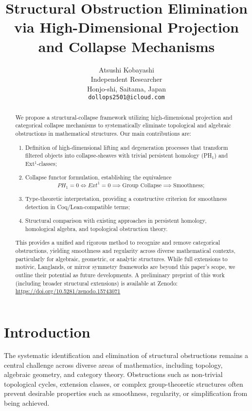 \documentclass[11pt]{article}
\title{Structural Obstruction Elimination via High-Dimensional Projection and Collapse Mechanisms}
\author{Atsushi Kobayashi\\
Independent Researcher\\
Honjo-shi, Saitama, Japan\\
\texttt{dollops2501@icloud.com}
}
\date{}
\begin{document}
\maketitle



\begin{abstract}
We propose a structural-collapse framework utilizing high-dimensional projection and categorical collapse mechanisms to systematically eliminate topological and algebraic obstructions in mathematical structures. Our main contributions are: 
\begin{enumerate}
    \item Definition of high-dimensional lifting and degeneration processes that transform filtered objects into collapse-sheaves with trivial persistent homology (PH$_1$) and Ext$^1$-classes;
    \item Collapse functor formulation, establishing the equivalence 
    \[
    PH_1 = 0 \iff Ext^1 = 0 \implies \text{Group Collapse} \implies \text{Smoothness};
    \]
    \item Type-theoretic interpretation, providing a constructive criterion for smoothness detection in Coq/Lean-compatible terms;
    \item Structural comparison with existing approaches in persistent homology, homological algebra, and topological obstruction theory.
\end{enumerate}
This provides a unified and rigorous method to recognize and remove categorical obstructions, yielding smoothness and regularity across diverse mathematical contexts, particularly for algebraic, geometric, or analytic structures. While full extensions to motivic, Langlands, or mirror symmetry frameworks are beyond this paper's scope, we outline their potential as future developments. A preliminary preprint of this work (including broader structural extensions) is available at Zenodo: \url{https://doi.org/10.5281/zenodo.15743071}
\end{abstract}


\section{Introduction}

The systematic identification and elimination of structural obstructions remains a central challenge across diverse areas of mathematics, including topology, algebraic geometry, and category theory. Obstructions such as non-trivial topological cycles, extension classes, or complex group-theoretic structures often prevent desirable properties such as smoothness, regularity, or simplification from being achieved.
\end{document}
